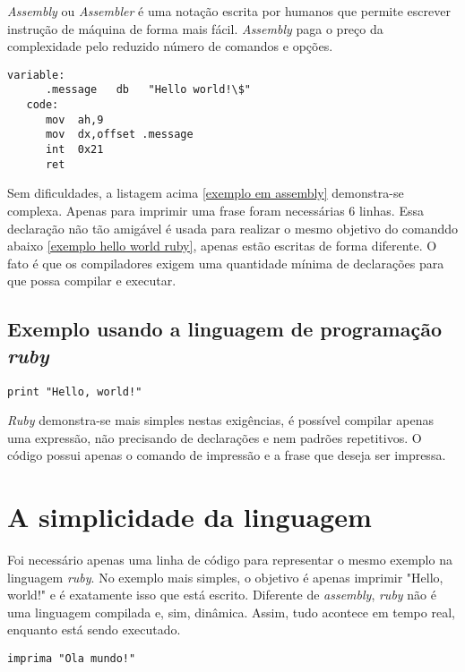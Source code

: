 \documentclass[espaco=simples,appendix=Name]{abnt}
\begin{document}
\textit{Assembly} ou \textit{Assembler} é uma notação escrita por humanos que permite escrever instrução de máquina de forma mais fácil. \textit{Assembly} paga o preço da complexidade pelo reduzido número de comandos e opções.

\begin{lstlisting}[label=exemplo em assembly,caption=Exemplo em \textit{assembly}]
   variable:
      .message   db   "Hello world!\$"
   code:
      mov  ah,9
      mov  dx,offset .message
      int  0x21
      ret
\end{lstlisting}

Sem dificuldades, a listagem acima \ref{exemplo em assembly} demonstra-se complexa. Apenas para imprimir uma frase foram necessárias 6 linhas. Essa declaração não tão amigável é usada para realizar o mesmo objetivo do comanddo abaixo \ref{exemplo hello world ruby}, apenas estão escritas de forma diferente. O fato é que os compiladores exigem uma quantidade mínima de declarações para que possa compilar e executar.


\subsection {Exemplo usando a linguagem de programação \textit{ruby}}

\begin{lstlisting}[caption=Exemplo em \textit{ruby}]
   print "Hello, world!"
\end{lstlisting}

 \textit{Ruby} demonstra-se mais simples nestas exigências, é possível compilar apenas uma expressão, não precisando de declarações e nem padrões repetitivos. O código possui apenas o comando de impressão e a frase que deseja ser impressa.

\section { A simplicidade da linguagem }

Foi necessário apenas uma linha de código para representar o mesmo exemplo na linguagem \textit{ruby}. No exemplo mais simples, o objetivo é apenas imprimir "Hello, world!" e é exatamente isso que está escrito. Diferente de \textit{assembly}, \textit{ruby} não é uma linguagem compilada e, sim, dinâmica. Assim, tudo acontece em tempo real, enquanto está sendo executado.
   
\begin{lstlisting}[caption=Tradução do programa \textit{ruby}]
   imprima "Ola mundo!"
\end{lstlisting}
\end{document}
